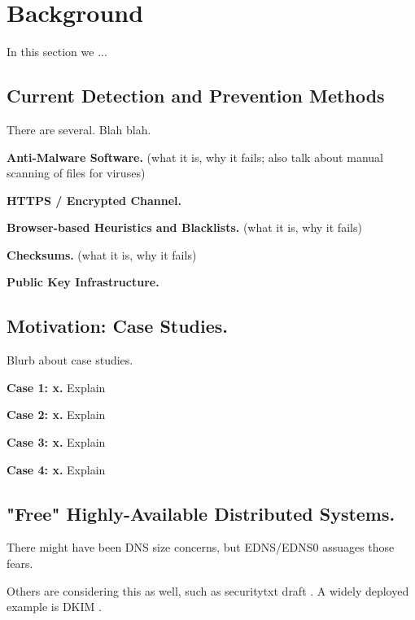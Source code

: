 \section{Background} \label{sec:background}

In this section we ...


\subsection{Current Detection and Prevention Methods}

There are several. Blah blah.

\textbf{Anti-Malware Software.}    (what it is, why it fails; also talk about
manual scanning of files for viruses)

\textbf{HTTPS / Encrypted Channel.}    \cite{HTTP, HTTPS, TLS1, TLS2, DTLS}

\textbf{Browser-based Heuristics and Blacklists.}    (what it is, why it fails)

\textbf{Checksums.}    (what it is, why it fails)

\textbf{Public Key Infrastructure.}    \cite{DANE1, DANE2, DANE3, OpenPGP1}

\subsection{Motivation: Case Studies.}

Blurb about case studies.

\textbf{Case 1: x.}    Explain

\textbf{Case 2: x.}    Explain

\textbf{Case 3: x.}    Explain

\textbf{Case 4: x.}    Explain

\subsection{"Free" Highly-Available Distributed Systems.}

There might have been DNS size concerns, but EDNS/EDNS0 \cite{EDNS} assuages those fears.

Others are considering this as well, such as securitytxt draft \cite{draft-sectxt}. A widely
deployed example is DKIM \cite{DKIM}.
